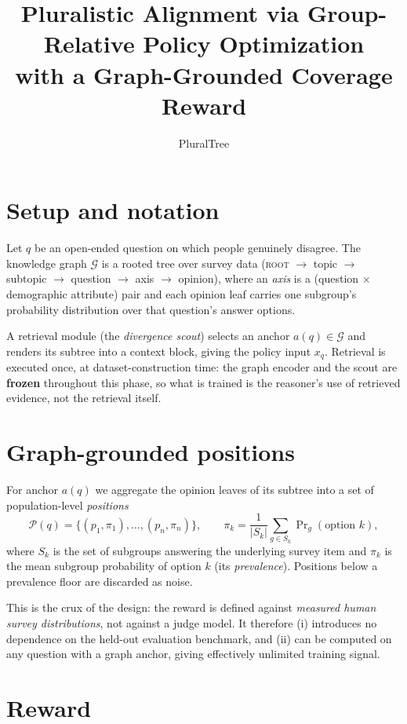 \documentclass[11pt]{article}
\title{Pluralistic Alignment via Group-Relative Policy Optimization\\
{\large with a Graph-Grounded Coverage Reward}}
\author{PluralTree}
\date{}
\newcommand{\Pos}{\mathcal{P}}
\begin{document}
\maketitle

\section{Setup and notation}

Let $q$ be an open-ended question on which people genuinely disagree. The
knowledge graph $\mathcal{G}$ is a rooted tree over survey data
(\textsc{root} $\to$ topic $\to$ subtopic $\to$ question $\to$ axis $\to$
opinion), where an \emph{axis} is a (question $\times$ demographic attribute)
pair and each opinion leaf carries one subgroup's probability distribution over
that question's answer options.

A retrieval module (the \emph{divergence scout}) selects an anchor
$a(q)\in\mathcal{G}$ and renders its subtree into a context block, giving the
policy input $x_q$. Retrieval is executed once, at dataset-construction time:
the graph encoder and the scout are \textbf{frozen} throughout this phase, so
what is trained is the reasoner's use of retrieved evidence, not the retrieval
itself.

\section{Graph-grounded positions}

For anchor $a(q)$ we aggregate the opinion leaves of its subtree into a set of
population-level \emph{positions}
\[
  \Pos(q)=\{(p_1,\pi_1),\dots,(p_n,\pi_n)\},
  \qquad
  \pi_k=\frac{1}{|S_k|}\sum_{g\in S_k} \Pr\nolimits_g(\text{option }k),
\]
where $S_k$ is the set of subgroups answering the underlying survey item and
$\pi_k$ is the mean subgroup probability of option $k$ (its \emph{prevalence}).
Positions below a prevalence floor are discarded as noise.

This is the crux of the design: the reward is defined against \emph{measured
human survey distributions}, not against a judge model. It therefore (i)
introduces no dependence on the held-out evaluation benchmark, and (ii) can be
computed on any question with a graph anchor, giving effectively unlimited
training signal.

\section{Reward}
\end{document}
